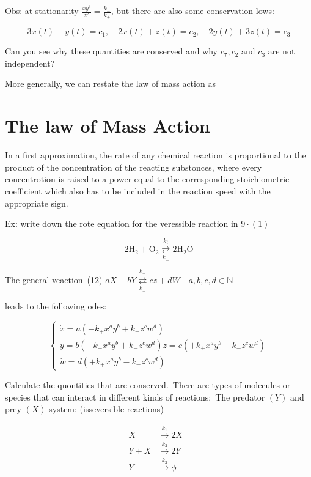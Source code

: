 Obs: at stationarity $\frac{x y^{3}}{z^{2}}=\frac{k_{-}}{k_{+}}$, but there are also some conservation lows:

$$ 
 3 x(t)-y(t)=c_{1}, \quad 2 x(t)+z(t)=c_{2}, \quad 2 y(t)+3 z(t)=c_{3} 
$$ 

Can you see why these quantities are conserved and why $c_{7}, c_{2}$ and $c_{3}$ are not independent?

More generally, we can restate the law of mass action as

\section*{The law of Mass Action}
In a first approximation, the rate of any chemical reaction is proportional to the product of the concentration of the reacting substonces, where every concentrotion is raised to a power equal to the corresponding stoichiometric coefficient which also has to be included in the reaction speed with the appropriate sign.

Ex: write down the rote equation for the veressible reaction in $9 \cdot(1)$

$$ 
 2 \mathrm{H}_{2}+\mathrm{O}_{2} \underset{k_{-}}{\stackrel{k_{t}}{\rightleftarrows}} 2 \mathrm{H}_{2} \mathrm{O} 
$$ 

The general veaction\
(12) $a X+b Y \underset{k_{-}}{\stackrel{k_{+}}{\rightleftarrows}} c z+d W \quad a, b, c, d \in \mathbb{N}$

leads to the following odes:

$$ 
 \left\{\begin{array}{l}
\dot{x}=a\left(-k_{+} x^{a} y^{b}+k_{-} z^{c} w^{d}\right) \\
\dot{y}=b\left(-k_{+} x^{a} y^{b}+k_{-} z^{c} w^{d}\right)
\dot{z}=c\left(+k_{+} x^{a} y^{b}-k_{-} z^{c} w^{d}\right) \\
\dot{w}=d\left(+k_{+} x^{a} y^{b}-k_{-} z^{c} w^{d}\right)
\end{array}\right. 
$$ 

Calculate the quontities that are conserved.\
There are types of molecules or species that can interact in different kinds of reactions:\
The predator $(Y)$ and prey $(X)$ system: (isseversible reactions)


\begin{align*}
 X & \xrightarrow{k_{1}} 2 X \\
 Y+X & \xrightarrow{k_{2}} 2 Y \quad \tag{13}\\
 Y & \xrightarrow{k_{3}} \phi
\end{align*} 


